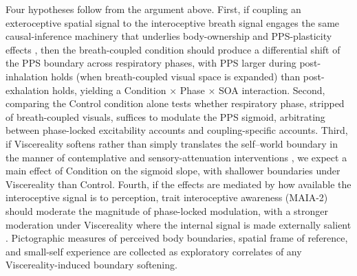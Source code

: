 Four hypotheses follow from the argument above. First, if coupling an exteroceptive spatial signal to the interoceptive breath signal engages the same causal-inference machinery that underlies body-ownership and PPS-plasticity effects \citep{samad_2015, chancel_2021, Ardizzi2018}, then the breath-coupled condition should produce a differential shift of the PPS boundary across respiratory phases, with PPS larger during post-inhalation holds (when breath-coupled visual space is expanded) than post-exhalation holds, yielding a Condition $\times$ Phase $\times$ SOA interaction. Second, comparing the Control condition alone tests whether respiratory phase, stripped of breath-coupled visuals, suffices to modulate the PPS sigmoid, arbitrating between phase-locked excitability accounts \citep{saltafossi_2025, kluger_2021, grund_2021} and coupling-specific accounts. Third, if Viscereality softens rather than simply translates the self--world boundary in the manner of contemplative and sensory-attenuation interventions \citep{Chiarella2024, hanley_2020, hruby_2024, nguyen_2020}, we expect a main effect of Condition on the sigmoid slope, with shallower boundaries under Viscereality than Control. Fourth, if the effects are mediated by how available the interoceptive signal is to perception, trait interoceptive awareness (MAIA-2) should moderate the magnitude of phase-locked modulation, with a stronger moderation under Viscereality where the internal signal is made externally salient \citep{Ardizzi2018, bogdanova_2021, Goral2024}. Pictographic measures of perceived body boundaries, spatial frame of reference, and small-self experience are collected as exploratory correlates of any Viscereality-induced boundary softening.

